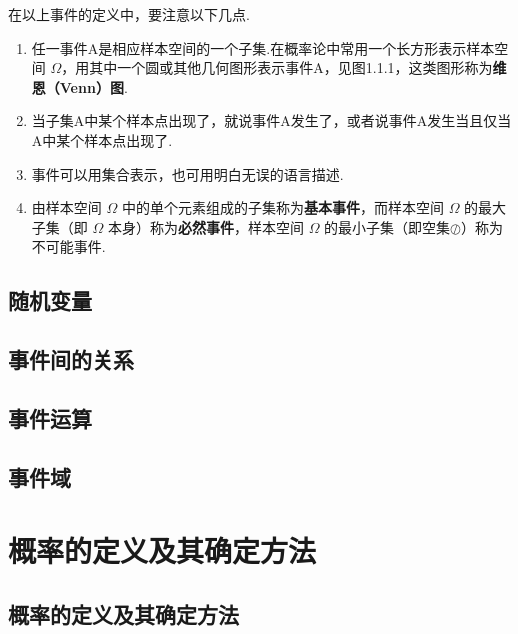 在以上事件的定义中，要注意以下几点.
\begin{enumerate}
	\item 任一事件A是相应样本空间的一个子集.在概率论中常用一个长方形表示样本空间 $\Omega$，用其中一个圆或其他几何图形表示事件A，见图1.1.1，这类图形称为\textbf{维恩（Venn）图}.
	\item 当子集A中某个样本点出现了，就说事件A发生了，或者说事件A发生当且仅当A中某个样本点出现了.
	\item 事件可以用集合表示，也可用明白无误的语言描述.
	\item 由样本空间 $\Omega$ 中的单个元素组成的子集称为\textbf{基本事件}，而样本空间 $\Omega$ 的最大子集（即 $\Omega$ 本身）称为\textbf{必然事件}，样本空间 $\Omega$ 的最小子集（即空集$\oslash$）称为不可能事件.
\end{enumerate}

\begin{example}
	
\end{example}




















\subsection{随机变量}
\subsection{事件间的关系}
\subsection{事件运算}
\subsection{事件域}

\section{概率的定义及其确定方法}
\subsection{概率的定义及其确定方法}
